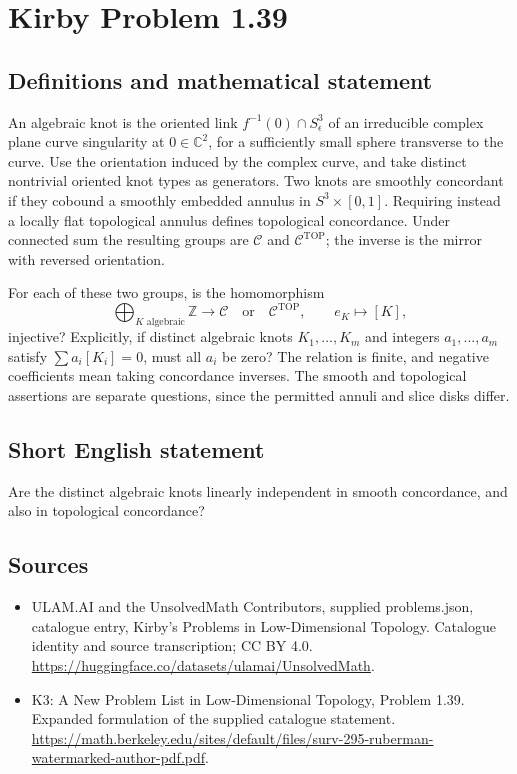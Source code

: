 \documentclass[11pt,a4paper]{article}
\begin{document}
\section*{Kirby Problem 1.39}\label{statement}

\subsection{Definitions and mathematical statement}
An algebraic knot is the oriented link $f^{-1}(0)\cap S^3_\epsilon$ of an
irreducible complex plane curve singularity at $0\in\mathbb C^2$, for a sufficiently
small sphere transverse to the curve. Use the orientation induced by the complex
curve, and take distinct nontrivial oriented knot types as generators.
Two knots are smoothly concordant if they cobound a smoothly embedded annulus
in $S^3\times[0,1]$. Requiring instead a locally flat topological annulus defines
topological concordance. Under connected sum the resulting groups are
$\mathcal C$ and $\mathcal C^{\mathrm{TOP}}$; the inverse is the mirror with
reversed orientation.

For each of these two groups, is the homomorphism
\[
\bigoplus_{K\text{ algebraic}}\mathbb Z\longrightarrow\mathcal C
\quad\text{or}\quad\mathcal C^{\mathrm{TOP}},\qquad e_K\longmapsto[K],
\]
injective? Explicitly, if distinct algebraic knots $K_1,\ldots,K_m$ and integers
$a_1,\ldots,a_m$ satisfy $\sum a_i[K_i]=0$, must all $a_i$ be zero?
The relation is finite, and negative coefficients mean taking concordance
inverses. The smooth and topological assertions are separate questions, since
the permitted annuli and slice disks differ.
\subsection{Short English statement}
Are the distinct algebraic knots linearly independent in smooth concordance, and also in topological concordance?
\subsection{Sources}
\begin{itemize}
\item[S1] ULAM.AI and the UnsolvedMath Contributors, supplied problems.json, catalogue entry, Kirby's Problems in Low-Dimensional Topology. Catalogue identity and source transcription; CC BY 4.0.
\url{https://huggingface.co/datasets/ulamai/UnsolvedMath}.
\item[S2] K3: A New Problem List in Low-Dimensional Topology, Problem 1.39. Expanded formulation of the supplied catalogue statement.
\url{https://math.berkeley.edu/sites/default/files/surv-295-ruberman-watermarked-author-pdf.pdf}.
\end{itemize}
\end{document}
